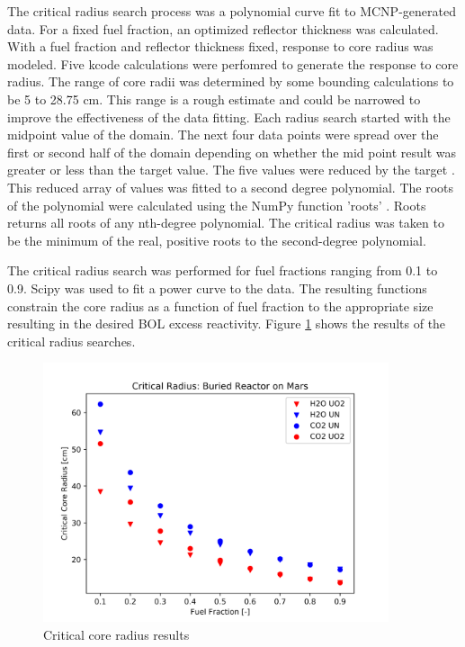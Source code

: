 The critical radius search process was a polynomial curve fit to MCNP-generated
\keff data. For a fixed fuel fraction, an optimized reflector thickness was
calculated. With a fuel fraction and reflector thickness fixed, \keff response
to core radius was modeled. Five kcode calculations were perfomred to generate
the \keff response to core radius. The range of core radii was determined by some
bounding calculations to be 5 to 28.75 cm. This range is a rough estimate and
could be narrowed to improve the effectiveness of the data fitting. Each radius
search started with the midpoint value of the domain. The next four data points
were spread over the first or second half of the domain depending on whether the
mid point result was greater or less than the target \keff value. The five \keff
values were reduced by the target \keff. This reduced array of values was fitted
to a second degree polynomial. The roots of the polynomial were calculated using
the NumPy function 'roots' \citep{numpy}. Roots returns all roots of any
nth-degree polynomial. The critical radius was taken to be the minimum of the
real, positive roots to the second-degree polynomial.

The critical radius search was performed for fuel fractions ranging from 0.1 to
0.9. Scipy was used to fit a power curve to the data. The resulting functions
constrain the core radius as a function of fuel fraction to the appropriate size
resulting in the desired BOL excess reactivity. Figure
\ref{fig:crit_core_radius} shows the results of the critical radius searches.

\begin{figure}[h]
    \centering
    \includegraphics[width=4in]{../images/crit_radius.png}
\caption{Critical core radius results}
\label{fig:crit_core_radius}
\end{figure}

